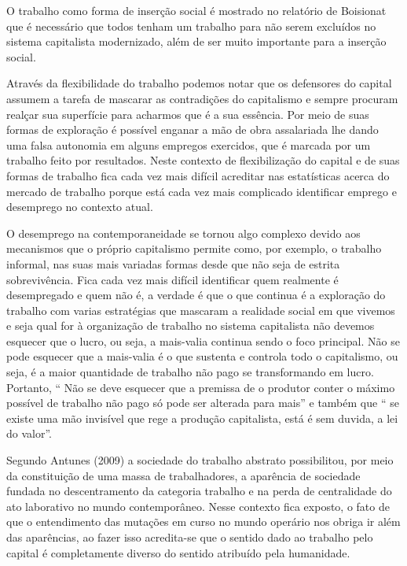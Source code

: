 O trabalho como forma de inserção social é mostrado no relatório de Boisionat que é necessário que 
todos tenham um trabalho para não serem excluídos no sistema capitalista modernizado, além de ser 
muito importante para a inserção social. 

Através da flexibilidade do trabalho podemos notar que os defensores do capital assumem a tarefa 
de mascarar as contradições do capitalismo e sempre procuram realçar sua superfície para acharmos 
que é a sua essência. Por meio de suas formas de exploração é possível enganar a mão de obra 
assalariada lhe dando uma falsa autonomia em alguns empregos exercidos, que é marcada por um 
trabalho feito por resultados. Neste contexto de flexibilização do capital e de suas formas de 
trabalho fica cada vez mais difícil acreditar nas estatísticas acerca do mercado de trabalho 
porque está cada vez mais complicado identificar emprego e desemprego no contexto atual.

O desemprego na contemporaneidade se tornou algo complexo devido aos mecanismos que o próprio 
capitalismo permite como, por exemplo, o trabalho informal, nas suas mais variadas formas desde 
que não seja de estrita sobrevivência. Fica cada vez mais difícil identificar quem realmente é 
desempregado e quem não é, a verdade é que o que continua é a exploração do trabalho com varias 
estratégias que mascaram a realidade social em que vivemos e seja qual for à organização de 
trabalho no sistema capitalista não devemos esquecer que o lucro, ou seja, a mais-valia continua 
sendo o foco principal. Não se pode esquecer que a mais-valia é o que sustenta e controla todo 
o capitalismo, ou seja, é a maior quantidade de trabalho não pago se transformando em lucro. 
Portanto, “ Não se deve esquecer que a premissa de o produtor conter o máximo possível de trabalho 
não pago só pode ser alterada para mais” e também que “ se existe uma mão invisível que rege a 
produção capitalista, está é sem duvida, a lei do valor”.

Segundo Antunes (2009) a sociedade do trabalho abstrato possibilitou, por meio da constituição 
de uma massa de trabalhadores, a aparência de sociedade fundada no descentramento da categoria 
trabalho e na perda de centralidade do ato laborativo no mundo contemporâneo. Nesse contexto fica 
exposto, o fato de que o entendimento das mutações em curso no mundo operário nos obriga ir além 
das aparências, ao fazer isso acredita-se que o sentido dado ao trabalho pelo capital é completamente 
diverso do sentido atribuído pela humanidade.

